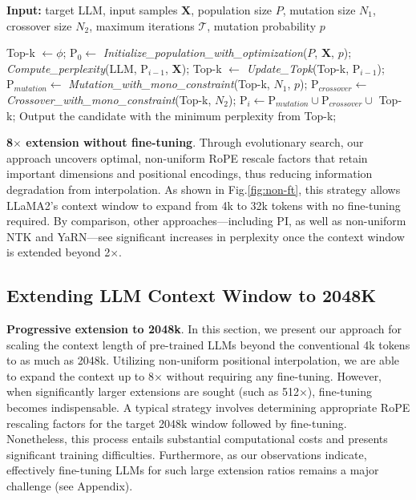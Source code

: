 \begin{algorithm}[t]
	\small
	\caption{The search algorithm}
	\textbf{Input:} target LLM, input samples $\mathbf{X}$, population size $P$, mutation size $N_1$, crossover size $N_2$, maximum iterations $\mathcal{T}$, mutation probability $p$\\

	\begin{algorithmic}[1]
		\label{alg:search}
		\STATE Top-k $\leftarrow \phi$;
		\STATE $\text{P}_0 \leftarrow$ \textit{Initialize\_population\_with\_optimization}($P$, $\mathbf{X}$, $p$);
		\STATE \textit{Compute\_perplexity}(LLM, $\text{P}_{i-1}$, $\mathbf{X}$);
		\STATE Top-k $\leftarrow$ \textit{Update\_Topk}(Top-k, $\text{P}_{i-1}$);
		\STATE $\text{P}_{mutation} \leftarrow$ \textit{Mutation\_with\_mono\_constraint}(Top-k, $N_1$, $p$);
		\STATE $\text{P}_{crossover} \leftarrow$ \textit{Crossover\_with\_mono\_constraint}(Top-k, $N_2$);
		\STATE $\text{P}_i \leftarrow \text{P}_{mutation} \cup \text{P}_{crossover} \cup$ Top-k;
		\ENDFOR
		\STATE Output the candidate with the minimum perplexity from Top-k;
	\end{algorithmic}
\end{algorithm}

\textbf{8$\times$ extension without fine-tuning}. Through evolutionary search, our approach uncovers optimal, non-uniform RoPE rescale factors that retain important dimensions and positional encodings, thus reducing information degradation from interpolation. As shown in Fig.\ref{fig:non-ft}, this strategy allows LLaMA2’s context window to expand from 4k to 32k tokens with no fine-tuning required. By comparison, other approaches—including PI, as well as non-uniform NTK and YaRN—see significant increases in perplexity once the context window is extended beyond 2$\times$.

\subsection{Extending LLM Context Window to 2048K}
\label{sec:extendto2048k}

\textbf{Progressive extension to 2048k}. In this section, we present our approach for scaling the context length of pre-trained LLMs beyond the conventional 4k tokens to as much as 2048k. Utilizing non-uniform positional interpolation, we are able to expand the context up to 8$\times$ without requiring any fine-tuning. However, when significantly larger extensions are sought (such as 512$\times$), fine-tuning becomes indispensable. A typical strategy involves determining appropriate RoPE rescaling factors for the target 2048k window followed by fine-tuning. Nonetheless, this process entails substantial computational costs and presents significant training difficulties. Furthermore, as our observations indicate, effectively fine-tuning LLMs for such large extension ratios remains a major challenge (see Appendix).

